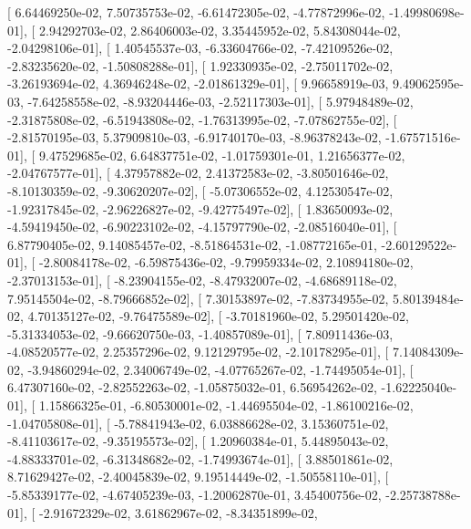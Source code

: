 \documentclass{article}
\begin{document}
       [  6.64469250e-02,   7.50735753e-02,  -6.61472305e-02,
         -4.77872996e-02,  -1.49980698e-01],
       [  2.94292703e-02,   2.86406003e-02,   3.35445952e-02,
          5.84308044e-02,  -2.04298106e-01],
       [  1.40545537e-03,  -6.33604766e-02,  -7.42109526e-02,
         -2.83235620e-02,  -1.50808288e-01],
       [  1.92330935e-02,  -2.75011702e-02,  -3.26193694e-02,
          4.36946248e-02,  -2.01861329e-01],
       [  9.96658919e-03,   9.49062595e-03,  -7.64258558e-02,
         -8.93204446e-03,  -2.52117303e-01],
       [  5.97948489e-02,  -2.31875808e-02,  -6.51943808e-02,
         -1.76313995e-02,  -7.07862755e-02],
       [ -2.81570195e-03,   5.37909810e-03,  -6.91740170e-03,
         -8.96378243e-02,  -1.67571516e-01],
       [  9.47529685e-02,   6.64837751e-02,  -1.01759301e-01,
          1.21656377e-02,  -2.04767577e-01],
       [  4.37957882e-02,   2.41372583e-02,  -3.80501646e-02,
         -8.10130359e-02,  -9.30620207e-02],
       [ -5.07306552e-02,   4.12530547e-02,  -1.92317845e-02,
         -2.96226827e-02,  -9.42775497e-02],
       [  1.83650093e-02,  -4.59419450e-02,  -6.90223102e-02,
         -4.15797790e-02,  -2.08516040e-01],
       [  6.87790405e-02,   9.14085457e-02,  -8.51864531e-02,
         -1.08772165e-01,  -2.60129522e-01],
       [ -2.80084178e-02,  -6.59875436e-02,  -9.79959334e-02,
          2.10894180e-02,  -2.37013153e-01],
       [ -8.23904155e-02,  -8.47932007e-02,  -4.68689118e-02,
          7.95145504e-02,  -8.79666852e-02],
       [  7.30153897e-02,  -7.83734955e-02,   5.80139484e-02,
          4.70135127e-02,  -9.76475589e-02],
       [ -3.70181960e-02,   5.29501420e-02,  -5.31334053e-02,
         -9.66620750e-03,  -1.40857089e-01],
       [  7.80911436e-03,  -4.08520577e-02,   2.25357296e-02,
          9.12129795e-02,  -2.10178295e-01],
       [  7.14084309e-02,  -3.94860294e-02,   2.34006749e-02,
         -4.07765267e-02,  -1.74495054e-01],
       [  6.47307160e-02,  -2.82552263e-02,  -1.05875032e-01,
          6.56954262e-02,  -1.62225040e-01],
       [  1.15866325e-01,  -6.80530001e-02,  -1.44695504e-02,
         -1.86100216e-02,  -1.04705808e-01],
       [ -5.78841943e-02,   6.03886628e-02,   3.15360751e-02,
         -8.41103617e-02,  -9.35195573e-02],
       [  1.20960384e-01,   5.44895043e-02,  -4.88333701e-02,
         -6.31348682e-02,  -1.74993674e-01],
       [  3.88501861e-02,   8.71629427e-02,  -2.40045839e-02,
          9.19514449e-02,  -1.50558110e-01],
       [ -5.85339177e-02,  -4.67405239e-03,  -1.20062870e-01,
          3.45400756e-02,  -2.25738788e-01],
       [ -2.91672329e-02,   3.61862967e-02,  -8.34351899e-02,
\end{document}
